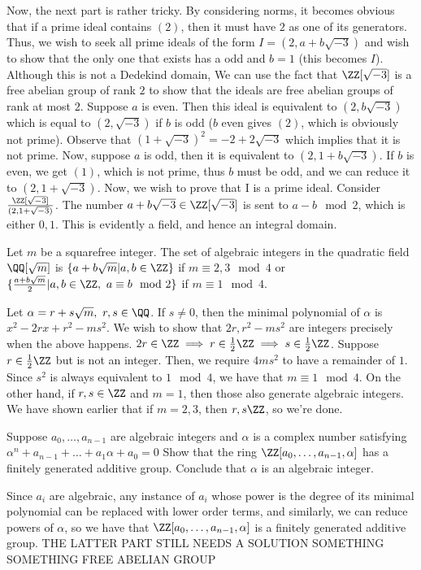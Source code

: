 Now, the next part is rather tricky. By considering norms, it becomes obvious that if a prime ideal contains \((2)\), then it must have \(2\) as one of its generators. Thus, we wish to seek all prime ideals of the form \(I=(2,a+b\sqrt{-3})\) and wish to show that the only one that exists has a odd and \(b=1\) (this becomes \(I\)). Although this is not a Dedekind domain, We can use the fact that \(\ZZ[\sqrt{-3}]\) is a free abelian group of rank \(2\) to show that the ideals are free abelian groups of rank at most \(2\). Suppose \(a\) is even. Then this ideal is equivalent to \((2,b\sqrt{-3})\) which is equal to \((2,\sqrt{-3})\) if \(b\) is odd (\(b\) even gives \((2)\), which is obviously not prime). Observe that \((1+\sqrt{-3})^2=-2+2\sqrt{-3}\) which implies that it is not prime. Now, suppose \(a\) is odd, then it is equivalent to \((2,1+b\sqrt{-3})\). If \(b\) is even, we get \((1)\), which is not prime, thus \(b\) must be odd, and we can reduce it to \((2,1+\sqrt{-3})\). Now, we wish to prove that I is a prime ideal. Consider \(\frac{\ZZ[\sqrt{-3}]}{(2,1+\sqrt{-3})}\). The number \(a+b\sqrt{-3} \in \ZZ[\sqrt{-3}]\) is sent to \(a-b \mod 2\), which is either \(0,1\). This is evidently a field, and hence an integral domain.
\begin{problem}
Let \(m\) be a squarefree integer. The set of algebraic integers in the quadratic field \(\QQ[\sqrt{m}]\) is \(\{a+b\sqrt{m}| a,b \in \ZZ\}\) if \( m \equiv 2,3 \mod 4\) or \(\{\frac{a+b\sqrt{m}}{2} | a,b \in \ZZ, \ a\equiv b \mod 2\}\) if \(m \equiv 1 \mod 4\).
\end{problem}
Let \(\alpha = r+s\sqrt{m},\ r,s \in \QQ\). If \(s \ne 0\), then the minimal polynomial of \(\alpha\) is \(x^2-2rx+r^2-ms^2\). We wish to show that \(2r, r^2-ms^2\) are integers precisely when the above happens. \(2r \in \ZZ \implies r \in \frac{1}{2}\ZZ \implies s \in \frac{1}{2}\ZZ\). Suppose \(r \in \frac{1}{2}\ZZ\) but is not an integer. Then, we require \(4ms^2\) to have a remainder of \(1\). Since \(s^2\) is always equivalent to \(1 \mod 4\), we have that \(m \equiv 1 \mod 4\). On the other hand, if \(r,s \in \ZZ\) and \(m=1\), then those also generate algebraic integers. We have shown earlier that if \(m=2,3\), then \(r,s \ZZ\), so we're done.

\begin{problem}
Suppose \(a_0,\dots,a_{n-1}\) are algebraic integers and \(\alpha\) is a complex number satisfying \(\alpha^n+a_{n-1}+\dots + a_1\alpha +a_0 =0\) Show that the ring \(\ZZ[a_0,\dots,a_{n-1},\alpha]\) has a finitely generated additive group. Conclude that \(\alpha\) is an algebraic integer.
\end{problem}
Since \(a_i\) are algebraic, any instance of \(a_i\) whose power is the degree of its minimal polynomial can be replaced with lower order terms, and similarly, we can reduce powers of \(\alpha\), so we have that \(\ZZ[a_0, \dots, a_{n-1}, \alpha]\) is a finitely generated additive group. THE LATTER PART STILL NEEDS A SOLUTION SOMETHING SOMETHING FREE ABELIAN GROUP

